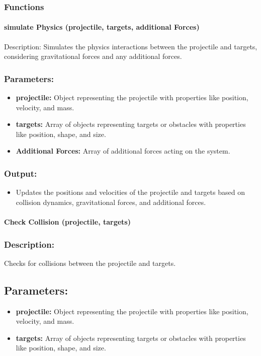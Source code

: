 \documentclass[12pt, titlepage]{article}
\begin{document}
\subsubsection{Functions}

\paragraph{simulate Physics (projectile, targets, additional Forces)}
\vspace{0.2cm}
Description: Simulates the physics interactions between the projectile and targets, considering gravitational forces and any additional forces.

\subsubsection*{Parameters:}
\begin{itemize}
  \item \textbf{projectile:} Object representing the projectile with properties like position, velocity, and mass.
  \item \textbf{targets:} Array of objects representing targets or obstacles with properties like position, shape, and size.
  \item \textbf{Additional Forces:} Array of additional forces acting on the system.
\end{itemize}

\subsubsection*{Output:}
\begin{itemize}
  \item Updates the positions and velocities of the projectile and targets based on collision dynamics, gravitational forces, and additional forces.
\end{itemize}

\paragraph{Check Collision (projectile, targets)} 

\subsubsection*{Description:} Checks for collisions between the projectile and targets.

\subsection*{Parameters:}
\begin{itemize}
  \item \textbf{projectile:} Object representing the projectile with properties like position, velocity, and mass.
  \item \textbf{targets:} Array of objects representing targets or obstacles with properties like position, shape, and size.
\end{itemize}
\end{document}
